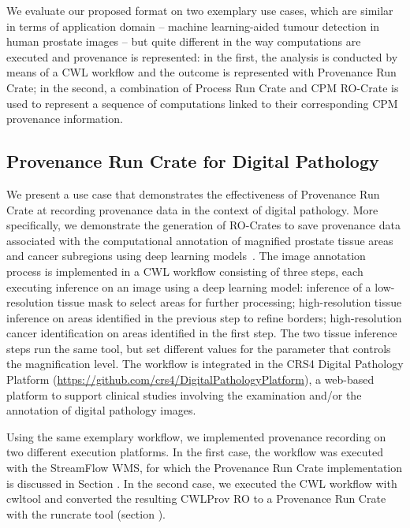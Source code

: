 \documentclass[10pt,letterpaper]{article}
\begin{document}
We evaluate our proposed format on two exemplary use cases, which are similar in terms of application domain -- machine learning-aided tumour detection in human prostate images -- but quite different in the way computations are executed and provenance is represented: in the first, the analysis is conducted by means of a CWL workflow and the outcome is represented with Provenance Run Crate; in the second, a combination of Process Run Crate and CPM RO-Crate is used to represent a sequence of computations linked to their corresponding CPM provenance information.


\subsection{Provenance Run Crate for Digital Pathology}\label{provenance-run-crate-for-digital-pathology}

We present a use case that demonstrates the effectiveness of Provenance Run Crate at recording provenance data in the context of digital pathology.
More specifically, we demonstrate the generation of RO-Crates to save provenance data associated with the computational annotation of magnified prostate tissue areas and cancer subregions using deep learning models~\cite{Del Rio 2022}.
The image annotation process is implemented in a CWL workflow consisting of three steps, each executing inference on an image using a deep learning model: inference of a low-resolution tissue mask to select areas for further processing;
high-resolution tissue inference on areas identified in the previous step to refine borders; high-resolution cancer identification on areas identified in the first step.
The two tissue inference steps run the same tool, but set different values for the parameter that controls the magnification level.
The workflow is integrated in the CRS4 Digital Pathology Platform (\url{https://github.com/crs4/DigitalPathologyPlatform}), a web-based platform to support clinical studies involving the examination and/or the annotation of digital pathology images.

Using the same exemplary workflow, we implemented provenance recording on two different execution platforms.
In the first case, the workflow was executed with the StreamFlow WMS, for which the Provenance Run Crate implementation is discussed in Section .
In the second case, we executed the CWL workflow with cwltool and converted the resulting CWLProv RO to a Provenance Run Crate with the runcrate tool (section ).
\end{document}
